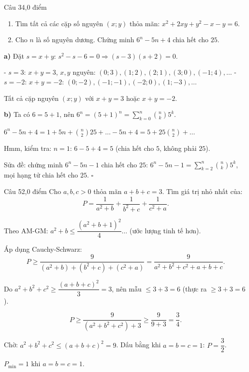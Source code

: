 \begin{de_cau}{Câu 3}{4,0 điểm}
\begin{enumerate}[label=\alph*)]
\item Tìm tất cả các cặp số nguyên $(x;y)$ thỏa mãn: $x^2+2xy+y^2-x-y=6$.
\item Cho $n$ là số nguyên dương. Chứng minh $6^n - 5n + 4$ chia hết cho $25$.
\end{enumerate}
\end{de_cau}

\begin{loi_giai_cau}
\textbf{a)} Đặt $s=x+y$: $s^2-s-6=0\Rightarrow (s-3)(s+2)=0$.

- $s=3$: $x+y=3$, $x,y$ nguyên: $(0;3),(1;2),(2;1),(3;0),(-1;4),\ldots$
- $s=-2$: $x+y=-2$: $(0;-2),(-1;-1),(-2;0),(1;-3),\ldots$

Tất cả cặp nguyên $(x;y)$ với $x+y=3$ hoặc $x+y=-2$.

\textbf{b)} Ta có $6=5+1$, nên $6^n=(5+1)^n=\sum_{k=0}^n\binom{n}{k}5^k$.

$6^n-5n+4 = 1+5n+\binom{n}{2}25+\ldots - 5n+4 = 5 + 25\binom{n}{2}+\ldots$

Hmm, kiểm tra: $n=1$: $6-5+4=5$ (chia hết cho $5$, không phải $25$).

Sửa đề: chứng minh $6^n-5n-1$ chia hết cho $25$:
$6^n-5n-1=\sum_{k=2}^n\binom{n}{k}5^k$, mọi hạng tử chia hết cho $25$. $\square$
\end{loi_giai_cau}

\begin{de_cau}{Câu 5}{2,0 điểm}
Cho $a,b,c>0$ thỏa mãn $a+b+c=3$. Tìm giá trị nhỏ nhất của:
\[P = \frac{1}{a^2+b} + \frac{1}{b^2+c} + \frac{1}{c^2+a}.\]
\end{de_cau}

\begin{loi_giai_cau}
Theo AM-GM: $a^2+b\leq \dfrac{(a^2+b+1)^2}{4}\ldots$ (ước lượng tinh tế hơn).

Áp dụng Cauchy-Schwarz:
\[P \geq \frac{9}{(a^2+b)+(b^2+c)+(c^2+a)} = \frac{9}{a^2+b^2+c^2+a+b+c}.\]

Do $a^2+b^2+c^2 \geq \dfrac{(a+b+c)^2}{3}=3$, nên mẫu $\leq 3+3=6$ (thực ra $\geq 3+3=6$).

\[P \geq \frac{9}{(a^2+b^2+c^2)+3} \geq \frac{9}{9+3} = \frac{3}{4}.\]

Chờ: $a^2+b^2+c^2\leq(a+b+c)^2=9$. Dấu bằng khi $a=b=c=1$: $P=\dfrac{3}{2}$.

$\boxed{P_{\min} = 1}$ khi $a=b=c=1$.
\end{loi_giai_cau}

